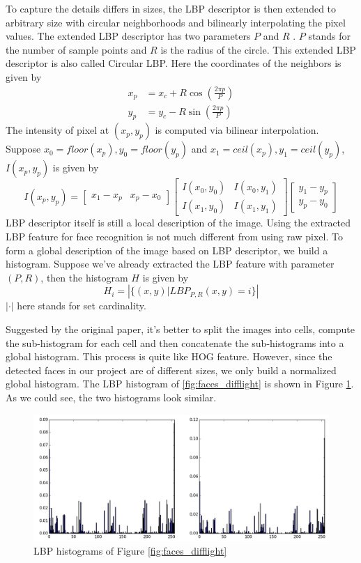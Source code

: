 \documentclass[paper=a4, fontsize=11pt]{scrartcl} %
\numberwithin{equation}{section} %
\numberwithin{figure}{section} %
\numberwithin{table}{section} %
\begin{document}
To capture the details differs in sizes, the LBP descriptor is then extended to arbitrary size with circular neighborhoods and bilinearly interpolating the pixel values. The extended LBP descriptor has two parameters $P$ and $R$ . $P$ stands for the number of sample points and $R$ is the radius of the circle. This extended LBP descriptor is also called Circular LBP. Here the coordinates of the neighbors is given by
$$
\begin{aligned}
x_p &= x_c + R\cos\left(\frac{2\pi p}{P}\right)\\
y_p &= y_c - R\sin\left(\frac{2\pi p}{P}\right)
\end{aligned}
$$
The intensity of pixel at $(x_p, y_p)$ is computed via bilinear interpolation. Suppose $x_0=floor(x_p), y_0=floor(y_p)$ and $x_1=ceil(x_p), y_1=ceil(y_p)$, $I(x_p, y_p)$  is given by
$$
I(x_p, y_p)=\begin{bmatrix}
x_1 - x_p & x_p - x_0
\end{bmatrix}
\begin{bmatrix}
I(x_0, y_0) & I(x_0, y_1) \\
I(x_1, y_0) & I(x_1, y_1)
\end{bmatrix}
\begin{bmatrix}
y_1 - y_p \\
y_p - y_0
\end{bmatrix}
$$
LBP descriptor itself is still a local description of the image. Using the extracted LBP feature for face recognition is not much different from using raw pixel. To form a global description of the image based on LBP descriptor, we build a histogram. Suppose we've already extracted the LBP feature with parameter $(P, R)$, then the histogram $H$ is given by
$$H_i=\left|\{(x, y)|LBP_{P,R}(x, y)=i\}\right|$$
$|\cdot|$ here stands for set cardinality.

Suggested by the original paper, it's better to split the images into cells, compute the sub-histogram for each cell and then concatenate the sub-histograms into a global histogram. This process is quite like HOG feature\cite{dalal2005histograms}. However, since the detected faces in our project are of different sizes, we only build a normalized global histogram. The LBP histogram of \ref{fig:faces_difflight} is shown in Figure \ref{fig:lbp_hist}. As we could see, the two histograms look similar.

\begin{figure}[htbp]
	\centering
	\includegraphics[width=6in]{lbp_hist.png}
	\caption{LBP histograms of Figure \ref{fig:faces_difflight}}
	\label{fig:lbp_hist}
\end{figure}
\end{document}
